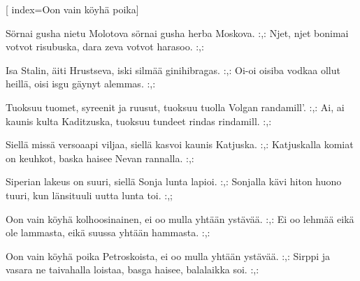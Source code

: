 [ 										
	index={Oon vain köyhä poika}]		
	
\beginverse*						
Sörnai gusha nietu Molotova
sörnai gusha herba Moskova.
:,: Njet, njet bonimai votvot risubuska,
dara zeva votvot harasoo. :,:
\endverse

\beginverse				
Isa Stalin, äiti Hrustseva,
iski silmää ginihibragas.
:,: Oi-oi oisiba vodkaa ollut heillä,
oisi isgu gäynyt alemmas. :,:
\endverse

\beginverse
Tuoksuu tuomet, syreenit ja ruusut, 
tuoksuu tuolla Volgan randamill'.
:,: Ai, ai kaunis kulta Kaditzuska,
tuoksuu tundeet rindas rindamill. :,:
\endverse

\beginverse
Siellä missä versoaapi viljaa, 
siellä kasvoi kaunis Katjuska.
:,: Katjuskalla komiat on keuhkot,
baska haisee Nevan rannalla. :,:
\endverse

\beginverse
Siperian lakeus on suuri,
siellä Sonja lunta lapioi.
:,: Sonjalla kävi hiton huono tuuri,
kun länsituuli uutta lunta toi. :,;
\endverse

\beginverse
Oon vain köyhä kolhoosinainen,
ei oo mulla yhtään ystävää.
:,: Ei oo lehmää eikä ole lammasta,
eikä suussa yhtään hammasta. :,:
\endverse

\beginverse
Oon vain köyhä poika Petroskoista,
ei oo mulla yhtään ystävää. 
:,: Sirppi ja vasara ne taivahalla loistaa,
basga haisee, balalaikka soi. :,:
\endverse		
\endsong		
